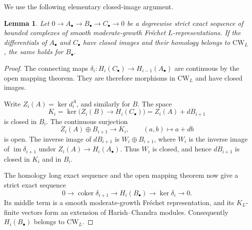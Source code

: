 \documentclass[a4paper,12pt]{amsart}
\numberwithin{equation}{section}
\theoremstyle{plain}
\newtheorem{lemma}[theorem]{Lemma}
\theoremstyle{definition}
\theoremstyle{remark}
\begin{document}
We use the following elementary closed-image argument.
\begin{lemma}\label{L:closed-range-extension}
Let $0\to A_\bullet\to B_\bullet\to C_\bullet\to0$ be a degreewise strict exact sequence of bounded complexes of smooth moderate-growth Fr\'echet $L$-representations.
If the differentials of $A_\bullet$ and $C_\bullet$ have closed images and their homology belongs to $\mathrm{CW}_L$, the same holds for $B_\bullet$.
\end{lemma}
\begin{proof}
The connecting maps $\delta_i:H_i(C_\bullet)\to H_{i-1}(A_\bullet)$ are continuous by the open mapping theorem.
They are therefore morphisms in $\mathrm{CW}_L$ and have closed images.

Write $Z_i(A)=\ker d_i^A$, and similarly for $B$.
The space
\[
 K_i=\ker\bigl(Z_i(B)\to H_i(C_\bullet)\bigr)
     =Z_i(A)+dB_{i+1}
\]
is closed in $B_i$.
The continuous surjection
\[
 Z_i(A)\oplus B_{i+1}\longrightarrow K_i,
 \qquad(a,b)\longmapsto a+db
\]
is open.
The inverse image of $dB_{i+1}$ is $W_i\oplus B_{i+1}$, where $W_i$ is the inverse image of $\operatorname{im}\delta_{i+1}$ under $Z_i(A)\to H_i(A_\bullet)$.
Thus $W_i$ is closed, and hence $dB_{i+1}$ is closed in $K_i$ and in $B_i$.

The homology long exact sequence and the open mapping theorem now give a strict exact sequence
\[
 0\longrightarrow\operatorname{coker}\delta_{i+1}
 \longrightarrow H_i(B_\bullet)
 \longrightarrow\ker\delta_i\longrightarrow0.
\]
Its middle term is a smooth moderate-growth Fr\'echet representation, and its $K_L$-finite vectors form an extension of Harish--Chandra modules.
Consequently $H_i(B_\bullet)$ belongs to $\mathrm{CW}_L$.
\end{proof}
\end{document}
